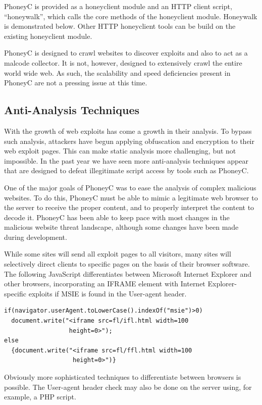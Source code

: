 \documentclass[10pt,twocolumn]{article}
\begin{document}
PhoneyC is provided as a honeyclient module and an HTTP client script, ``honeywalk'', which calls the core methods of the honeyclient module. Honeywalk is demonstrated below. Other HTTP honeyclient tools can be build on the existing honeyclient module. 

PhoneyC is designed to crawl websites to discover exploits and also to act as a malcode collector. It is not, however, designed to extensively crawl the entire world wide web. As such, the scalability and speed deficiencies present in PhoneyC are not a pressing issue at this time. 

\subsection{Anti-Analysis Techniques}
\label{anti-analysis}

With the growth of web exploits has come a growth in their analysis. To bypass such analysis, attackers have begun applying obfuscation and encryption to their web exploit pages. This can make static analysis more challenging, but not impossible. In the past year we have seen more anti-analysis techniques appear that are designed to defeat illegitimate script access by tools such as PhoneyC. 

One of the major goals of PhoneyC was to ease the analysis of complex malicious websites. To do this, PhoneyC must be able to mimic a legitimate web browser to the server to receive the proper content, and to properly interpret the content to decode it. PhoneyC has been able to keep pace with most changes in the malicious website threat landscape, although some changes have been made during development. 

While some sites will send all exploit pages to all visitors, many sites will selectively direct clients to specific pages on the basis of their browser software. The following JavaScript differentiates between Microsoft Internet Explorer and other browsers, incorporating an IFRAME element with Internet Explorer-specific exploits if MSIE is found in the User-agent header. 
\scriptsize
\begin{verbatim}
if(navigator.userAgent.toLowerCase().indexOf("msie")>0)
  document.write("<iframe src=fl/ifl.html width=100 
                  height=0>");
else
  {document.write("<iframe src=fl/ffl.html width=100 
                   height=0>")}
\end{verbatim}
\normalsize
Obviously more sophisticated techniques to differentiate between browsers is possible. The User-agent header check may also be done on the server using, for example, a PHP script. 
\end{document}
